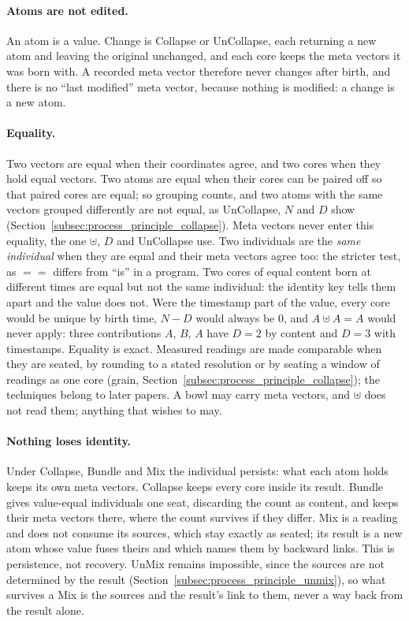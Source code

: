 \documentclass[12pt, a4paper]{article}
\begin{document}
\paragraph{Atoms are not edited.} An atom is a value. Change is
Collapse or UnCollapse, each returning a new atom and leaving the
original unchanged, and each core keeps the meta vectors it was born
with. A recorded meta vector therefore never changes after birth, and
there is no ``last modified'' meta vector, because nothing is modified:
a change is a new atom.

\paragraph{Equality.} Two vectors are equal when their coordinates agree, and two cores when they hold equal vectors. Two atoms are equal when their cores can be paired off so that paired cores are equal; so grouping counts, and two atoms with the same vectors grouped differently are not equal, as UnCollapse, $N$ and $D$ show (Section~\ref{subsec:process_principle_collapse}). Meta vectors never enter this equality, the one $\uplus$, $D$ and UnCollapse use. Two individuals are the \emph{same individual} when they are equal and their meta vectors agree too: the stricter test, as $==$ differs from ``is'' in a program. Two cores of equal content born at different times are equal but not the same individual: the identity key tells them apart and the value does not. Were the timestamp part of the value, every core would be unique by birth time, $N-D$ would always be $0$, and $A\uplus A=A$ would never apply: three contributions $A$, $B$, $A$ have $D=2$ by content and $D=3$ with timestamps. Equality is exact. Measured readings are made comparable when they are seated, by rounding to a stated resolution or by seating a window of readings as one core (grain, Section~\ref{subsec:process_principle_collapse}); the techniques belong to later papers. A bowl may carry meta vectors, and $\uplus$ does not read them; anything that wishes to may.

\paragraph{Nothing loses identity.} Under Collapse, Bundle and Mix the
individual persists: what each atom holds keeps its own meta vectors.
Collapse keeps every core inside its result. Bundle gives value-equal
individuals one seat, discarding the count as content, and keeps their
meta vectors there, where the count survives if they differ. Mix is a
reading and does not consume its sources, which stay exactly as seated;
its result is a new atom whose value fuses theirs and which names them by
backward links. This is persistence, not recovery. UnMix remains
impossible, since the sources are not determined by the result
(Section~\ref{subsec:process_principle_unmix}), so what survives a Mix is
the sources and the result's link to them, never a way back from the
result alone.
\end{document}
